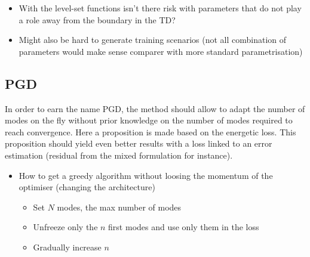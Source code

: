 \begin{itemize}
	\item With the level-set functions isn't there risk with parameters that do not play a role away from the boundary in the TD?
	\item Might also be hard to generate training scenarios (not all combination of parameters would make sense comparer with more standard parametrisation)
\end{itemize}


\subsection{PGD}
In order to earn the name PGD, the method should allow to adapt the number of modes on the fly without prior knowledge on the number of modes required to reach convergence. Here a proposition is made based on the energetic loss. This proposition should yield even better results with a loss linked to an error estimation (residual from the mixed formulation for instance).
\begin{itemize}
	\item How to get a greedy algorithm without loosing the momentum of the optimiser (changing the architecture)
	\begin{itemize}
		\item Set $N$ modes, the max number of modes
		\item Unfreeze only the $n$ first modes and use only them in the loss
		\item Gradually increase $n$
	\end{itemize}
\end{itemize}




